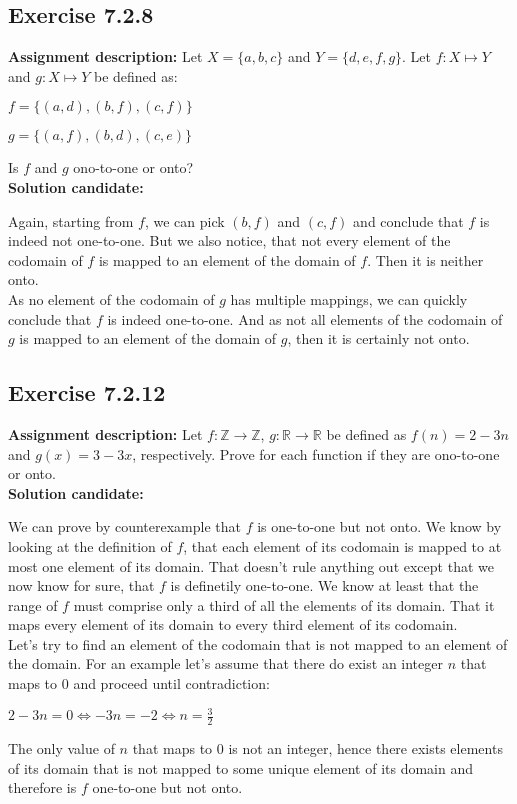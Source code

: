 \documentclass{report}
\newcommand{\cent}[1]{\begin{center}#1\end{center}}
\newcommand{\doubleR}{\mathbb{R}}
\newcommand{\doubleZ}{\mathbb{Z}}
\newcommand{\assignmentDescription}{\textbf{Assignment description: }}
\newcommand{\solution}{\textbf{Solution candidate: }}
\newcommand{\Exercise}[1]{\subsection{Exercise #1}}
\begin{document}
 	\Exercise{7.2.8}
 	
 	\assignmentDescription
 	Let $X = \{a,b,c\}$ and $Y = \{d,e,f,g\}$. Let $f : X \mapsto Y$ and $g : X \mapsto Y$ be defined as:
 	
 	\cent{$f = \{(a,d),(b,f),(c,f)\}$}
 	\cent{$g = \{(a,f),(b,d),(c,e)\}$}
 	
 	Is $f$ and $g$ ono-to-one or onto?\\
 	
 	\solution
 	
 	Again, starting from $f$, we can pick $(b,f)$ and $(c,f)$ and conclude that $f$ is indeed not one-to-one. But we also notice, that not every element of the codomain of $f$ is mapped to an element of the domain of $f$. Then it is neither onto.\\
 	
 	As no element of the codomain of $g$ has multiple mappings, we can quickly conclude that $f$ is indeed one-to-one. And as not all elements of the codomain of $g$ is mapped to an element of the domain of $g$, then it is certainly not onto.
 	
 	\Exercise{7.2.12}
 	
 	\assignmentDescription
 	Let $f : \doubleZ \to \doubleZ$, $g : \doubleR \to \doubleR $ be defined as $f(n) = 2-3n$ and $g(x) = 3-3x$, respectively. Prove for each function if they are ono-to-one or onto.\\
 	
 	\solution
 	
 	We can prove by counterexample that $f$ is one-to-one but not onto. We know by looking at the definition of $f$, that each element of its codomain is mapped to at most one element of its domain. That doesn't rule anything out except that we now know for sure, that $f$ is definetily one-to-one. We know at least that the range of $f$ must comprise only a third of all the elements of its domain. That it maps every element of its domain to every third element of its codomain.\\
 	
 	Let's try to find an element of the codomain that is not mapped to an element of the domain. For an example let's assume that there do exist an integer $n$ that maps to 0 and proceed until contradiction:
 	
 	\cent{$2-3n=0 \Leftrightarrow -3n=-2 \Leftrightarrow n = \frac{3}{2}$}
 	
 	The only value of $n$ that maps to 0 is not an integer, hence there exists elements of its domain that is not mapped to some unique element of its domain and therefore is $f$ one-to-one but not onto.\\
 	
\end{document}
